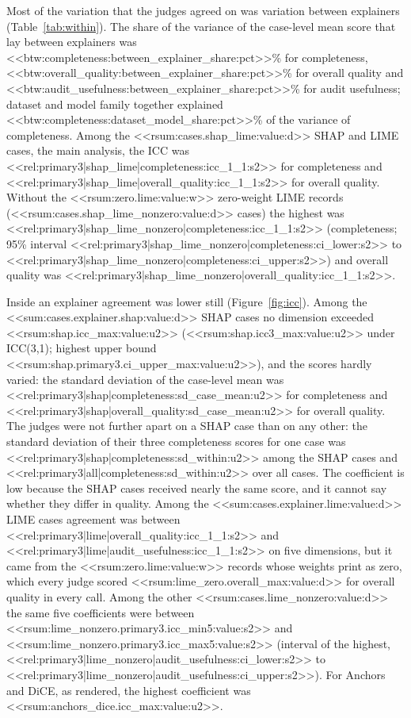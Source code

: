 \documentclass[12pt,letterpaper]{article}
\begin{document}
Most of the variation that the judges agreed on was variation between explainers
(Table~\ref{tab:within}). The share of the variance of the case-level mean score that
lay between explainers was <<btw:completeness:between_explainer_share:pct>>\% for
completeness, <<btw:overall_quality:between_explainer_share:pct>>\% for overall quality
and <<btw:audit_usefulness:between_explainer_share:pct>>\% for audit usefulness; dataset
and model family together explained <<btw:completeness:dataset_model_share:pct>>\% of the
variance of completeness. Among the <<rsum:cases.shap_lime:value:d>> SHAP and LIME cases,
the main analysis, the ICC was <<rel:primary3|shap_lime|completeness:icc_1_1:s2>> for
completeness and <<rel:primary3|shap_lime|overall_quality:icc_1_1:s2>> for overall
quality. Without the <<rsum:zero.lime:value:w>> zero-weight LIME records
(<<rsum:cases.shap_lime_nonzero:value:d>> cases) the highest was
<<rel:primary3|shap_lime_nonzero|completeness:icc_1_1:s2>> (completeness; 95\% interval
<<rel:primary3|shap_lime_nonzero|completeness:ci_lower:s2>> to
<<rel:primary3|shap_lime_nonzero|completeness:ci_upper:s2>>) and overall quality was
<<rel:primary3|shap_lime_nonzero|overall_quality:icc_1_1:s2>>.

Inside an explainer agreement was lower still (Figure~\ref{fig:icc}). Among the
<<sum:cases.explainer.shap:value:d>> SHAP cases no dimension exceeded
<<rsum:shap.icc_max:value:u2>> (<<rsum:shap.icc3_max:value:u2>> under ICC(3,1); highest
upper bound <<rsum:shap.primary3.ci_upper_max:value:u2>>), and
the scores hardly varied: the standard deviation of the case-level mean was
<<rel:primary3|shap|completeness:sd_case_mean:u2>> for completeness and
<<rel:primary3|shap|overall_quality:sd_case_mean:u2>> for overall quality. The judges were not
further apart on a SHAP case than on any other: the standard deviation of their three
completeness scores for one case was <<rel:primary3|shap|completeness:sd_within:u2>> among
the SHAP cases and <<rel:primary3|all|completeness:sd_within:u2>> over all cases. The
coefficient is low because the SHAP cases received nearly the same score, and it cannot
say whether they differ in quality. Among the <<sum:cases.explainer.lime:value:d>> LIME cases agreement was
between <<rel:primary3|lime|overall_quality:icc_1_1:s2>> and
<<rel:primary3|lime|audit_usefulness:icc_1_1:s2>> on five dimensions, but it came from the
<<rsum:zero.lime:value:w>> records whose weights print as zero, which every judge scored
<<rsum:lime_zero.overall_max:value:d>> for overall quality in every call. Among the other
<<rsum:cases.lime_nonzero:value:d>> the same five coefficients were between
<<rsum:lime_nonzero.primary3.icc_min5:value:s2>> and
<<rsum:lime_nonzero.primary3.icc_max5:value:s2>> (interval of the highest,
<<rel:primary3|lime_nonzero|audit_usefulness:ci_lower:s2>> to
<<rel:primary3|lime_nonzero|audit_usefulness:ci_upper:s2>>). For Anchors and DiCE, as rendered, the
highest coefficient was <<rsum:anchors_dice.icc_max:value:u2>>.
\end{document}
